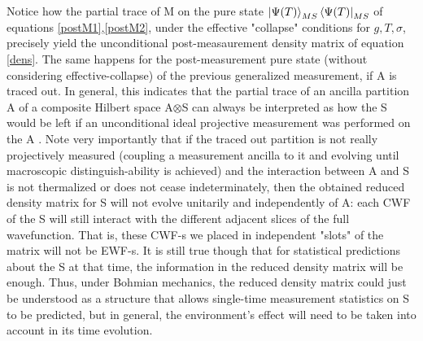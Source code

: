 \documentclass[11pt, a4paper]{article} %
\begin{document}
Notice how the partial trace of M on the pure state $\ket{\Psi(T)}_{MS}\bra{\Psi(T)}_{MS}$ of equations \eqref{postM1},\eqref{postM2}, under the effective "collapse" conditions for $g,T,\sigma$, precisely yield the unconditional post-measaurement density matrix of equation \eqref{dens}. The same happens for the post-measurement pure state (without considering effective-collapse) of the previous generalized measurement, if A is traced out. In general, this indicates that the partial trace of an ancilla partition A of a composite Hilbert space A$\otimes$S can always be interpreted as how the S would be left if an unconditional ideal projective measurement was performed on the A \cite{Generalized}. Note very importantly that if the traced out partition is not really projectively measured (coupling a measurement ancilla to it and evolving until macroscopic distinguish-ability is achieved) and the interaction between A and S is not thermalized or does not cease indeterminately, then the obtained reduced density matrix for S will not evolve unitarily and independently of A: each CWF of the S will still interact with the different adjacent slices of the full wavefunction. That is, these CWF-s we placed in independent "slots" of the matrix will not be EWF-s. It is still true though that for statistical predictions about the S at that time, the information in the reduced density matrix will be enough. Thus, under Bohmian mechanics, the reduced density matrix could just be understood as a structure that allows single-time measurement statistics on S to be predicted, but in general, the environment's effect will need to be taken into account in its time evolution. %
\end{document}
